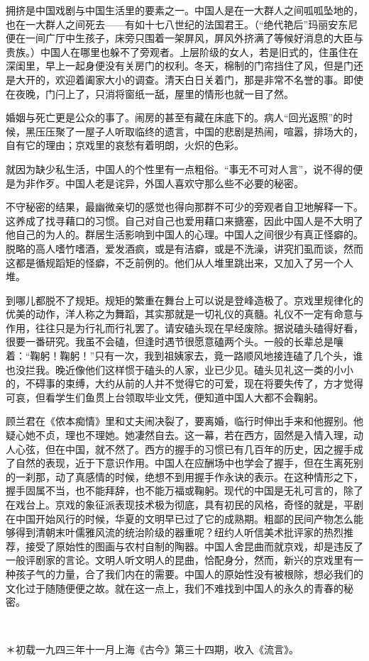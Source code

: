 \par 拥挤是中国戏剧与中国生活里的要素之一。中国人是在一大群人之间呱呱坠地的，也在一大群人之间死去——有如十七八世纪的法国君王。（“绝代艳后”玛丽安东尼便在一间广厅中生孩子，床旁只围着一架屏风，屏风外挤满了等候好消息的大臣与贵族。）中国人在哪里也躲不了旁观者。上层阶级的女人，若是旧式的，住虽住在深闺里，早上一起身便没有关房门的权利。冬天，棉制的门帘挡住了风，但是门还是大开的，欢迎着阖家大小的调查。清天白日关着门，那是非常不名誉的事。即使在夜晚，门闩上了，只消将窗纸一舐，屋里的情形也就一目了然。
\par 婚姻与死亡更是公众的事了。闹房的甚至有藏在床底下的。病人“回光返照”的时候，黑压压聚了一屋子人听取临终的遗言，中国的悲剧是热闹，喧嚣，排场大的，自有它的理由；京戏里的哀愁有着明朗，火炽的色彩。
\par 就因为缺少私生活，中国人的个性里有一点粗俗。“事无不可对人言”，说不得的便是为非作歹。中国人老是诧异，外国人喜欢守那么些不必要的秘密。
\par 不守秘密的结果，最幽微亲切的感觉也得向那群不可少的旁观者自卫地解释一下。这养成了找寻藉口的习惯。自己对自己也爱用藉口来搪塞，因此中国人是不大明了他自己的为人的。群居生活影响到中国人的心理。中国人之间很少有真正怪癖的。脱略的高人嗜竹嗜酒，爱发酒疯，或是有洁癖，或是不洗澡，讲究扪虱而谈，然而这都是循规蹈矩的怪癖，不乏前例的。他们从人堆里跳出来，又加入了另一个人堆。
\par 到哪儿都脱不了规矩。规矩的繁重在舞台上可以说是登峰造极了。京戏里规律化的优美的动作，洋人称之为舞蹈，其实那就是一切礼仪的真髓。礼仪不一定有命意与作用，往往只是为行礼而行礼罢了。请安磕头现在早经废除。据说磕头磕得好看，很要一番研究。我虽不会磕，但逢时遇节很愿意磕两个头。一般的长辈总是嚷着：“鞠躬！鞠躬！”只有一次，我到祖姨家去，竟一路顺风地接连磕了几个头，谁也没拦我。晚近像他们这样惯于磕头的人家，业已少见。磕头见礼这一类的小小的，不碍事的束缚，大约从前的人并不觉得它的可爱，现在将要失传了，方才觉得可哀，但看学生们鱼贯上台领取毕业文凭，便知道中国人大都不会鞠躬。
\par 顾兰君在《侬本痴情》里和丈夫闹决裂了，要离婚，临行时伸出手来和他握别。他疑心她不贞，理也不理她。她凄然自去。这一幕，若在西方，固然是入情入理，动人心弦，但在中国，就不然了。西方的握手的习惯已有几百年的历史，因之握手成了自然的表现，近于下意识作用。中国人在应酬场中也学会了握手，但在生离死别的一刹那，动了真感情的时候，绝想不到用握手作永诀的表示。在这种情形之下，握手固属不当，也不能拜辞，也不能万福或鞠躬。现代的中国是无礼可言的，除了在戏台上。京戏的象征派表现技术极为彻底，具有初民的风格，奇怪的就是，平剧在中国开始风行的时候，华夏的文明早已过了它的成熟期。粗鄙的民间产物怎么能够得到清朝末叶儒雅风流的统治阶级的器重呢？纽约人听信美术批评家的热烈推荐，接受了原始性的图画与农村自制的陶器。中国人舍昆曲而就京戏，却是违反了一般评剧家的言论。文明人听文明人的昆曲，恰配身分，然而，新兴的京戏里有一种孩子气的力量，合了我们内在的需要。中国人的原始性没有被根除，想必我们的文化过于随随便便之故。就在这一点上，我们不难找到中国人的永久的青春的秘密。
\par  
\par ＊初载一九四三年十一月上海《古今》第三十四期，收入《流言》。


